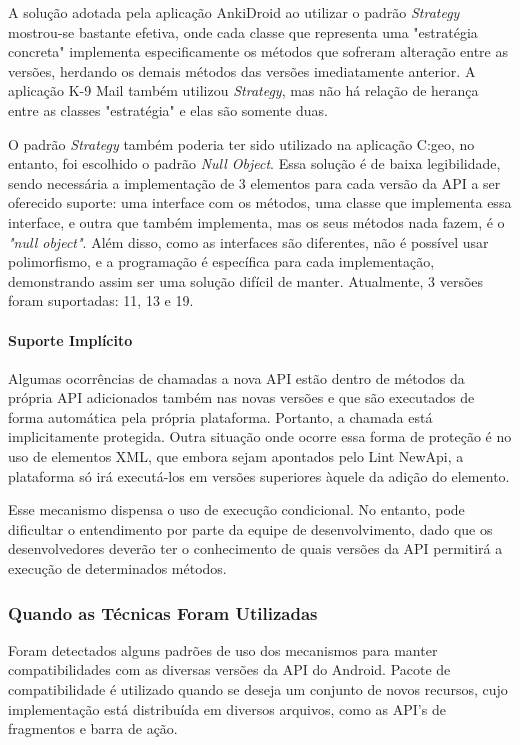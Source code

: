 A solução adotada pela aplicação AnkiDroid ao utilizar o padrão \textit{Strategy}
mostrou-se bastante efetiva, onde cada classe que representa uma "estratégia concreta"
implementa especificamente os métodos que sofreram alteração entre as versões, herdando
os demais métodos das versões imediatamente anterior. A aplicação K-9 Mail também utilizou
\textit{Strategy}, mas não há relação de herança entre as classes "estratégia" e elas são
somente duas.

O padrão \textit{Strategy} também poderia ter sido utilizado na aplicação C:geo,
no entanto, foi escolhido o padrão \textit{Null Object}. Essa solução é de baixa
legibilidade, sendo necessária a implementação de 3 elementos para cada versão da
API a ser oferecido suporte: uma interface com os métodos, uma classe que implementa
essa interface, e outra que também implementa, mas os seus métodos nada fazem, é o
\textit{"null object"}. Além disso, como as interfaces são diferentes, não é possível
usar polimorfismo, e a programação é específica para cada implementação, demonstrando
assim ser uma solução difícil de manter. Atualmente, 3 versões foram suportadas:
11, 13 e 19.

\paragraph{Suporte Implícito}

Algumas ocorrências de chamadas a nova API estão dentro de métodos da própria API
adicionados também nas novas versões e que são executados de forma automática pela
própria plataforma. Portanto, a chamada está implicitamente protegida. Outra situação
onde ocorre essa forma de proteção é no uso de elementos XML, que embora sejam apontados
pelo Lint NewApi, a plataforma só irá executá-los em versões superiores àquele da adição
do elemento. 

Esse mecanismo dispensa o uso de execução condicional. No entanto, pode dificultar o
entendimento por parte da equipe de desenvolvimento, dado que os desenvolvedores deverão
ter o conhecimento de quais versões da API permitirá a execução de determinados métodos.

\subsubsection{Quando as Técnicas Foram Utilizadas}

Foram detectados alguns padrões de uso dos mecanismos para manter compatibilidades com
as diversas versões da API do Android. Pacote de compatibilidade é utilizado quando se
deseja um conjunto de novos recursos, cujo implementação está distribuída em diversos
arquivos, como as API's de fragmentos e barra de ação.

